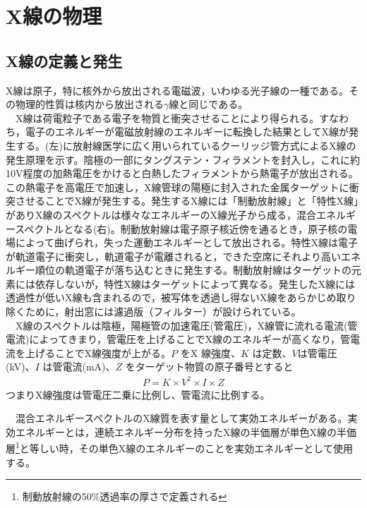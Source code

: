 
\chapter{X線の物理}
\section{X線の定義と発生}
X線は原子，特に核外から放出される電磁波，いわゆる光子線の一種である。その物理的性質は核内から放出される$\gamma$線と同じである。\\
\ \ X線は荷電粒子である電子を物質と衝突させることにより得られる。すなわち，電子のエネルギーが電磁放射線のエネルギーに転換した結果としてX線が発生する。(左)に放射線医学に広く用いられているクーリッジ管方式によるX線の発生原理を示す。陰極の一部にタングステン・フィラメントを封入し，これに約10V程度の加熱電圧をかけると白熱したフィラメントから熱電子が放出される。この熱電子を高電圧で加速し，X線管球の陽極に封入された金属ターゲットに衝突させることでX線が発生する。発生するX線には「制動放射線」と「特性X線」がありX線のスペクトルは様々なエネルギーのX線光子から成る，混合エネルギースペクトルとなる(右)。制動放射線は電子原子核近傍を通るとき，原子核の電場によって曲げられ，失った運動エネルギーとして放出される。特性X線は電子が軌道電子に衝突し，軌道電子が電離されると，できた空席にそれより高いエネルギー順位の軌道電子が落ち込むときに発生する。制動放射線はターゲットの元素には依存しないが，特性X線はターゲットによって異なる。発生したX線には透過性が低いX線も含まれるので，被写体を透過し得ないX線をあらかじめ取り除くために，射出窓には濾過版（フィルター）が設けられている。\\
\ \ X線のスペクトルは陰極，陽極管の加速電圧(管電圧)，X線管に流れる電流(管電流)によってきまり，管電圧を上げることでX線のエネルギーが高くなり，管電流を上げることでX線強度が上がる。$P$ をX 線強度、$K$ は定数、$V $は管電圧(kV)、$I$ は管電流(mA)、$Z$ をターゲット物質の原子番号とすると
\begin{align}
P=K\times V^2\times I \times Z
\end{align}
つまりX線強度は管電圧二乗に比例し、管電流に比例する。

\  \ 混合エネルギースペクトルのX線質を表す量として実効エネルギーがある。実効エネルギーとは，連続エネルギー分布を持ったX線の半価層が単色X線の半価層\footnote{制動放射線の50$\%$透過率の厚さで定義される}と等しい時，その単色X線のエネルギーのことを実効エネルギーとして使用する。

